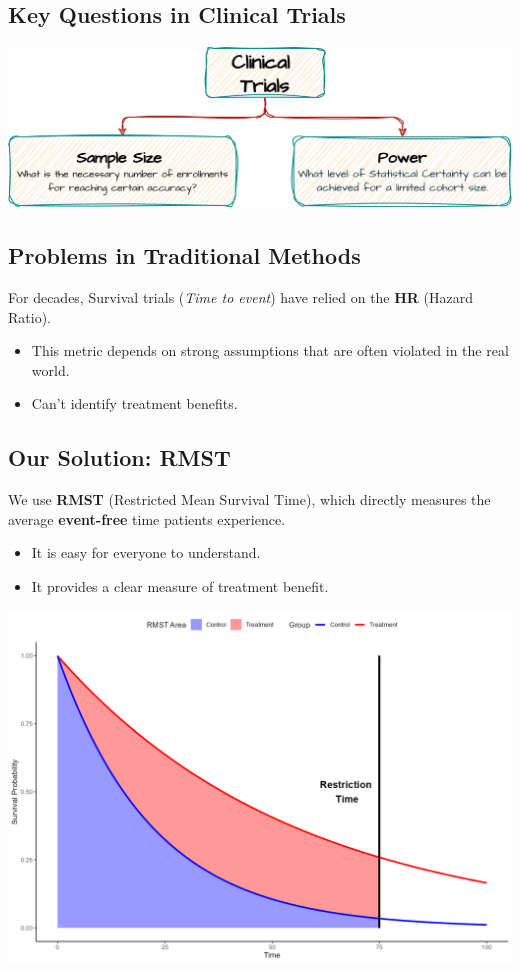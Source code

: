 \documentclass[a0,landscape]{a0poster}
\begin{document}
\begin{minipage}[t]{0.44\linewidth}

    \subsection*{\huge Key Questions in Clinical Trials}
    \begin{center}
        \includegraphics[width=\linewidth]{images/diag-CT.png}
    \end{center}

    \subsection*{\Large Problems in Traditional Methods}
    \large For decades, Survival trials (\textit{Time to event}) have relied on the \textbf{HR} (Hazard Ratio).
    \begin{itemize}
        \item[\large\checkmark] This metric depends on strong assumptions that are often violated in the real world.
        \item[\large\checkmark] Can't identify treatment benefits.
    \end{itemize}
    \subsection*{\Large Our Solution: RMST}
    \large We use \textbf{RMST} (Restricted Mean Survival Time), which directly measures the average \textbf{event-free} time patients experience.
    \begin{itemize}
        \item[\large\checkmark] It is easy for everyone to understand.
        \item[\large\checkmark] It provides a clear measure of treatment benefit.
    \end{itemize}
    \begin{center}
        \includegraphics[width=\linewidth,height = 0.5\linewidth]{images/rmst_causal_plot.png}
    \end{center}
\end{minipage}
\end{document}
